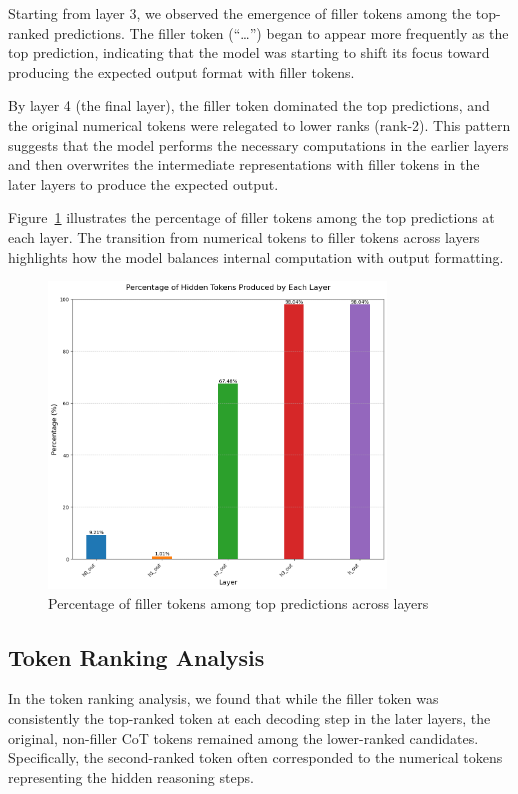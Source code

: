 \documentclass{article}
\begin{document}
Starting from layer 3, we observed the emergence of filler tokens among the top-ranked predictions. The filler token (``\ldots'') began to appear more frequently as the top prediction, indicating that the model was starting to shift its focus toward producing the expected output format with filler tokens.

By layer 4 (the final layer), the filler token dominated the top predictions, and the original numerical tokens were relegated to lower ranks (rank-2). This pattern suggests that the model performs the necessary computations in the earlier layers and then overwrites the intermediate representations with filler tokens in the later layers to produce the expected output.

Figure~\ref{fig:hidden_token_percentages} illustrates the percentage of filler tokens among the top predictions at each layer. The transition from numerical tokens to filler tokens across layers highlights how the model balances internal computation with output formatting.

\begin{figure}[H]
\centering
\includegraphics[width=0.8\textwidth]{hidden_tokens_percentage_by_layer.png}
\caption{Percentage of filler tokens among top predictions across layers}
\label{fig:hidden_token_percentages}
\end{figure}

\subsection{Token Ranking Analysis}

In the token ranking analysis, we found that while the filler token was consistently the top-ranked token at each decoding step in the later layers, the original, non-filler CoT tokens remained among the lower-ranked candidates. Specifically, the second-ranked token often corresponded to the numerical tokens representing the hidden reasoning steps.
\end{document}
